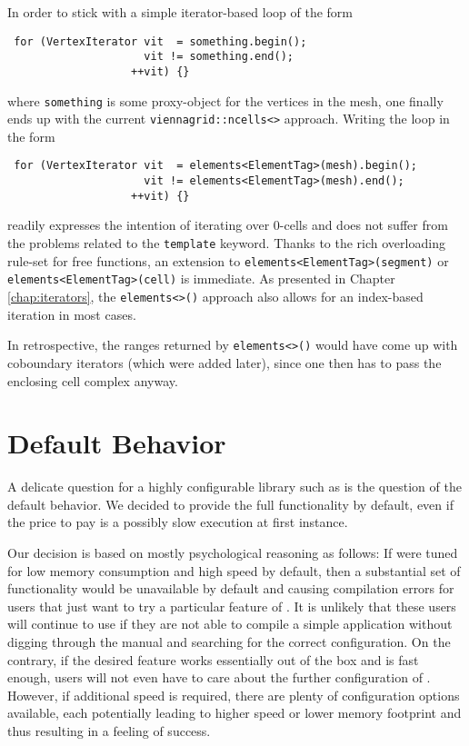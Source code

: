  In order to stick with a simple iterator-based loop of the form
 \begin{lstlisting}
 for (VertexIterator vit  = something.begin();
                     vit != something.end();
                   ++vit) {}
 \end{lstlisting}
 where \lstinline|something| is some proxy-object for the vertices in the mesh, one finally ends up with the current \lstinline|viennagrid::ncells<>| approach.
 Writing the loop in the form
 \begin{lstlisting}
 for (VertexIterator vit  = elements<ElementTag>(mesh).begin();
                     vit != elements<ElementTag>(mesh).end();
                   ++vit) {}
 \end{lstlisting}
 readily expresses the intention of iterating over $0$-cells and does not suffer from the problems related to the \lstinline|template| keyword.
 Thanks to the rich overloading rule-set for free functions, an extension to \lstinline|elements<ElementTag>(segment)| or \lstinline|elements<ElementTag>(cell)| is immediate.
 As presented in Chapter \ref{chap:iterators}, the \lstinline|elements<>()| approach also allows for an index-based iteration in most cases.

 In retrospective, the ranges returned by \lstinline|elements<>()| would have come up with coboundary iterators (which were added later), since one then has to pass the enclosing cell complex anyway.

 \section{Default Behavior}
 A delicate question for a highly configurable library such as {\ViennaGrid} is the question of the default behavior.
 We decided to provide the full functionality by default, even if the price to pay is a possibly slow execution at first instance.

 Our decision is based on mostly psychological reasoning as follows: If {\ViennaGrid} were tuned for low memory consumption and high speed by default, then a substantial set of functionality would be unavailable by default and causing compilation errors for users that just want to try a particular feature of {\ViennaGrid}.
 It is unlikely that these users will continue to use {\ViennaGrid} if they are not able to compile a simple application without digging through the manual and searching for the correct configuration. On the contrary, if the desired feature works essentially out of the box and is fast enough, users will not even have to care about the further configuration of {\ViennaGrid}. However, if additional speed is required, there are plenty of configuration options available, each potentially leading to higher speed or lower memory footprint and thus resulting in a feeling of success.

